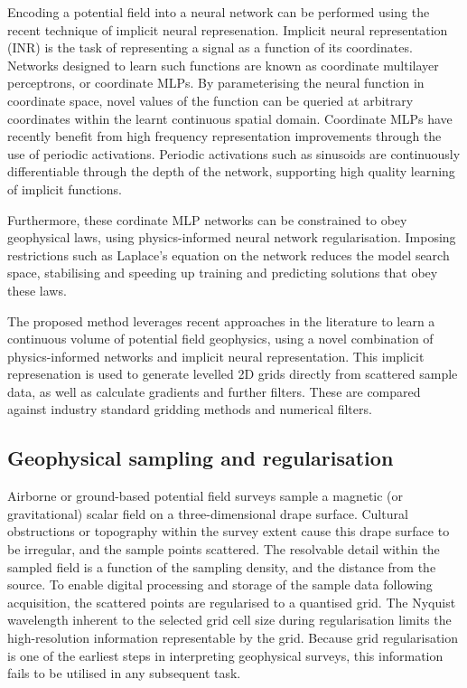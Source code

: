 \documentclass[manuscript.tex]{subfiles}
\begin{document}
Encoding a potential field into a neural network can be performed using the recent technique of implicit neural represenation.
Implicit neural representation (INR) is the task of representing a signal as a function of its coordinates.
Networks designed to learn such functions are known as coordinate multilayer perceptrons, or coordinate MLPs.
By parameterising the neural function in coordinate space, novel values of the function can be queried at arbitrary coordinates within the learnt continuous spatial domain.
Coordinate MLPs have recently benefit from high frequency representation improvements through the use of periodic activations.
Periodic activations such as sinusoids are continuously differentiable through the depth of the network, supporting high quality learning of implicit functions.

Furthermore, these cordinate MLP networks can be constrained to obey geophysical laws, using physics-informed neural network regularisation.
Imposing restrictions such as Laplace's equation on the network reduces the model search space, stabilising and speeding up training and predicting solutions that obey these laws.

The proposed method leverages recent approaches in the literature to learn a continuous volume of potential field geophysics, using a novel combination of physics-informed networks and implicit neural representation.
This implicit represenation is used to generate levelled 2D grids directly from scattered sample data, as well as calculate gradients and further filters.
These are compared against industry standard gridding methods and numerical filters.

\subsection{Geophysical sampling and regularisation}
\label{sec:geo_airborne}
Airborne or ground-based potential field surveys sample a magnetic (or gravitational) scalar field on a three-dimensional drape surface.
Cultural obstructions or topography within the survey extent cause this drape surface to be irregular, and the sample points scattered.
The resolvable detail within the sampled field is a function of the sampling density, and the distance from the source.
To enable digital processing and storage of the sample data following acquisition, the scattered points are regularised to a quantised grid.
The Nyquist wavelength inherent to the selected grid cell size during regularisation limits the high-resolution information representable by the grid.
Because grid regularisation is one of the earliest steps in interpreting geophysical surveys, this information fails to be utilised in any subsequent task.
\end{document}
